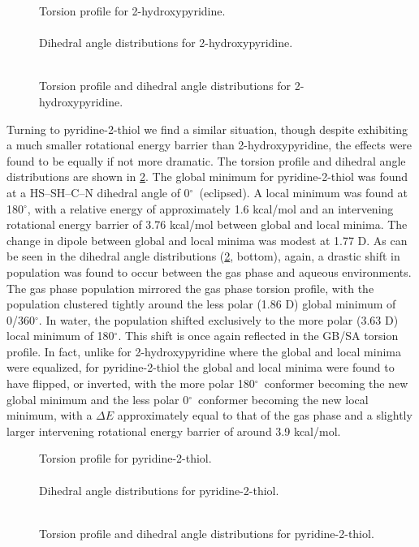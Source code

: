 \documentclass[12pt]{report}
\def\deg{$^{\circ}$}
\begin{document}
\begin{figure}[htbp]
\centering
Torsion profile for 2-hydroxypyridine.\\
\\
Dihedral angle distributions for 2-hydroxypyridine.\\
\\
\caption{Torsion profile and dihedral angle distributions for 2-hydroxypyridine.}
\label{dihp6ohgb}
\end{figure}

Turning to pyridine-2-thiol we find a similar situation, though despite exhibiting a much smaller rotational energy barrier than 2-hydroxypyridine, the effects were found to be equally if not more dramatic. The torsion profile and dihedral angle distributions are shown in \cref{dihp6shgb}. The global minimum for pyridine-2-thiol was found at a HS--SH--C--N dihedral angle of 0\deg\ (eclipsed). A local minimum was found at 180\deg, with a relative energy of approximately 1.6 kcal/mol and an intervening rotational energy barrier of 3.76 kcal/mol between global and local minima. The change in dipole between global and local minima was modest at 1.77 D. As can be seen in the dihedral angle distributions (\cref{dihp6shgb}, bottom), again, a drastic shift in population was found to occur between the gas phase and aqueous environments. The gas phase population mirrored the gas phase torsion profile, with the population clustered tightly around the less polar (1.86 D) global minimum of 0/360\deg. In water, the population shifted exclusively to the more polar (3.63 D) local minimum of 180\deg. This shift is once again reflected in the GB/SA torsion profile. In fact, unlike for 2-hydroxypyridine where the global and local minima were equalized, for pyridine-2-thiol the global and local minima were found to have flipped, or inverted, with the more polar 180\deg\ conformer becoming the new global minimum and the less polar 0\deg\ conformer becoming the new local minimum, with a $\Delta E$ approximately equal to that of the gas phase and a slightly larger intervening rotational energy barrier of around 3.9 kcal/mol.

\begin{figure}[htbp]
\centering
Torsion profile for pyridine-2-thiol.\\
\\
Dihedral angle distributions for pyridine-2-thiol.\\
\\
\caption{Torsion profile and dihedral angle distributions for pyridine-2-thiol.}
\label{dihp6shgb}
\end{figure}
\end{document}

